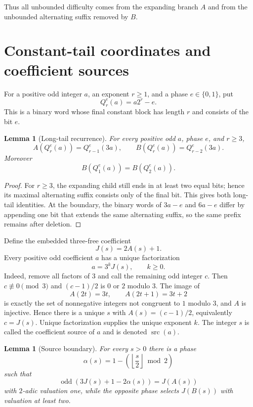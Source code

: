 \documentclass[11pt]{article}
\newtheorem{lemma}[theorem]{Lemma}
\newcommand{\odd}{\operatorname{odd}}
\newcommand{\src}{\operatorname{src}}
\begin{document}
Thus all unbounded difficulty comes from the expanding branch $A$ and from the
unbounded alternating suffix removed by $B$.

\section{Constant-tail coordinates and coefficient sources}

For a positive odd integer $a$, an exponent $r\ge1$, and a phase
$e\in\{0,1\}$, put
\[
  Q_r^e(a)=a2^r-e.
\]
This is a binary word whose final constant block has length $r$ and consists
of the bit $e$.

\begin{lemma}[Long-tail recurrence]\label{lem:long-tail}
For every positive odd $a$, phase $e$, and $r\ge3$,
\[
  A(Q_r^e(a))=Q_{r-1}^e(3a),\qquad
  B(Q_r^e(a))=Q_{r-2}^e(3a).
\]
Moreover
\[
  B(Q_1^e(a))=B(Q_2^e(a)).
\]
\end{lemma}

\begin{proof}
For $r\ge3$, the expanding child still ends in at least two equal bits; hence
its maximal alternating suffix consists only of the final bit. This gives both
long-tail identities. At the boundary, the binary words of $3a-e$ and $6a-e$
differ by appending one bit that extends the same alternating suffix, so the
same prefix remains after deletion.
\end{proof}

Define the embedded three-free coefficient
\[
  J(s)=2A(s)+1.
\]
Every positive odd coefficient $a$ has a unique factorization
\[
  a=3^kJ(s),\qquad k\ge0.
\]
Indeed, remove all factors of $3$ and call the remaining odd integer $c$.
Then $c\not\equiv0\pmod3$ and $(c-1)/2$ is $0$ or $2$ modulo $3$.
The image of
\[
 A(2t)=3t,\qquad A(2t+1)=3t+2
\]
is exactly the set of nonnegative integers not congruent to $1$ modulo $3$,
and $A$ is injective. Hence there is a unique $s$ with
$A(s)=(c-1)/2$, equivalently $c=J(s)$. Unique factorization supplies the
unique exponent $k$. The integer $s$ is called the coefficient source of
$a$ and is denoted $\src(a)$.

\begin{lemma}[Source boundary]\label{lem:source-boundary}
For every $s>0$ there is a phase
\[
  \alpha(s)=1-\left(\left\lfloor\frac{s}{2}\right\rfloor\bmod2\right)
\]
such that
\[
  \odd(3J(s)+1-2\alpha(s))=J(A(s))
\]
with $2$-adic valuation one, while the opposite phase selects $J(B(s))$ with
valuation at least two.
\end{lemma}
\end{document}
